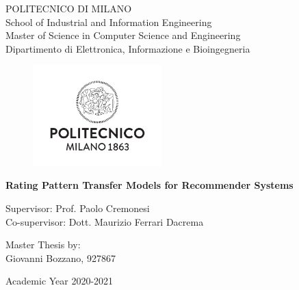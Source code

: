 \thispagestyle{empty}
\vspace*{-1.5cm} \bfseries{
\begin{center}
	\LARGE
	POLITECNICO DI MILANO\\
	\vspace*{0.3cm}
	\normalsize
	School of Industrial and Information Engineering\\
	Master of Science in Computer Science and Engineering\\
	Dipartimento di Elettronica, Informazione e Bioingegneria\\
	\vspace*{0.8cm}
	\begin{figure}[htbp]
		\begin{center}
			\includegraphics[width=5cm]{pictures/logo}
		\end{center}
	\end{figure}
	\vspace*{0.3cm} \LARGE
	\textbf{Rating Pattern Transfer Models for Recommender Systems}\\
	\vspace*{.75truecm} \large
\end{center}
\vspace*{3.0cm} \large
\begin{flushleft}
	Supervisor: Prof. Paolo Cremonesi\\
	Co-supervisor: Dott. Maurizio Ferrari Dacrema\\
\end{flushleft}
\vspace*{1.0cm}
\begin{flushright}
	Master Thesis by:\\
	Giovanni Bozzano, 927867\\
\end{flushright}
\vspace*{1.0cm}
\begin{center}
	Academic Year 2020-2021
\end{center} \clearpage
}